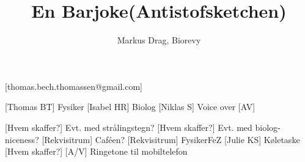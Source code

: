 \documentclass[a4paper,12pt]{article}
\title{En Barjoke(Antistofsketchen)}
\author{Markus Drag, Biorevy}
\begin{document}
\maketitle

\begin{instructors}
  \instructor[Julie KS]
\end{instructors}

\begin{texxers}
	[thomas.bech.thomassen@gmail.com]
\end{texxers}

\begin{roles}
	[Thomas BT] Fysiker
	[Isabel HR] Biolog
	[Niklas S] Voice over
	[AV]
\end{roles}


\begin{props}
	[Hvem skaffer?] Evt. med strålingstegn?
	[Hvem skaffer?] Evt. med biolog-niceness?
	[Rekvisitrum] Caféen?
	[Rekvisitrum] FysikerFeZ
	[Julie KS] Køletaske
	[Hvem skaffer?]
	[A/V] Ringetone til mobiltelefon
\end{props}
\end{document}
